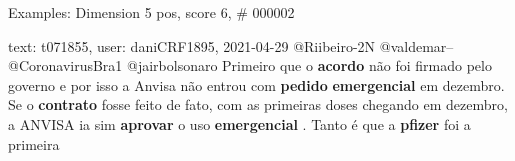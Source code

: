 \begin{frame}{Examples: Dimension 5 pos, score 6, \# 000002}
\footnotesize
\begin{exampleblock}{text: t071855, user: daniCRF1895, 2021-04-29}
@Riibeiro-2N @valdemar-- @CoronavirusBra1 @jairbolsonaro Primeiro que o 
\textbf{acordo} não foi firmado pelo governo e por isso a Anvisa não entrou com 
\textbf{pedido} \textbf{emergencial} em dezembro. Se o \textbf{contrato} fosse 
feito de fato, com as primeiras doses chegando em dezembro, a ANVISA ia sim 
\textbf{aprovar} o uso \textbf{emergencial} . Tanto é que a \textbf{pfizer} foi 
a primeira 
\end{exampleblock}
\end{frame}
